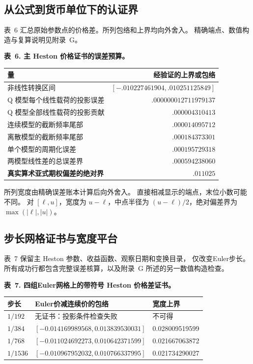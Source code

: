 \subsection{从公式到货币单位下的认证界}

表~6 汇总原始参数点的价格差。所列包络和上界均向外舍入。
精确端点、数值构造与复算说明见附录~G。

\noindent\textbf{表~6. 主 Heston 价格证书的误差预算。}
\begin{center}
\begin{tabularx}{\textwidth}{@{}X r@{}}
\toprule
量 & 经验证的上界或包络 \\
\midrule
非线性转换区间 & \([-.010227461904,.010251125849]\) \\
Q 模型每个线性载荷的投影误差 & \(.000000012711979137\) \\
Q 模型全部线性载荷的投影贡献 & \(.000004310413\) \\
连续模型的截断频率尾部 & \(.000014095712\) \\
离散模型的截断频率尾部 & \(.000184373301\) \\
单个模型的周期化误差 & \(.000195729318\) \\
两模型线性差的总误差界 & \(.000594238060\) \\
\textbf{真实算术亚式期权偏差的绝对界} & \(\boldsymbol{.011025}\) \\
\bottomrule
\end{tabularx}
\end{center}

所列宽度由精确误差账本计算后向外舍入。
直接相减显示的端点，末位小数可能不同。
对 \([\ell,u]\)，宽度为 \(u-\ell\)，中点半径为
\((u-\ell)/2\)，绝对偏差界为
\(\max(|\ell|,|u|)\)。

\subsection{步长网格证书与宽度平台}

表~7 保留主 Heston 参数、收益函数、观察日期和变换目录，
仅改变Euler步长。所有成功行都包含完整误差核算，以及附录~G
所述的另一数值构造检查。

\noindent\textbf{表~7. 四组Euler网格上的带符号 Heston 价格差证书。}
\begin{center}
\begin{tabularx}{\textwidth}{@{}l X X@{}}
\toprule
步长 & Euler价减连续价的包络 & 宽度上界 \\
\midrule
\(1/192\) & 无证书：投影条件检查失败 & 不可得 \\
\(1/384\) & \([-0.014169989568,0.013839530031]\) & 0.028009519599 \\
\(1/768\) & \([-0.011024692273,0.010642371599]\) & 0.021667063872 \\
\(1/1536\) & \([-0.010967952032,0.010766337995]\) & 0.021734290027 \\
\bottomrule
\end{tabularx}
\end{center}

